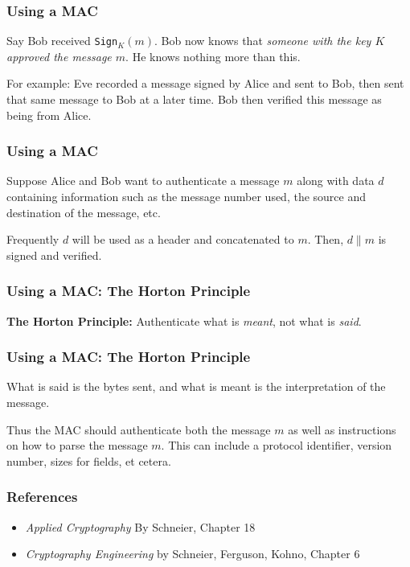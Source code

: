 \documentclass{beamer}
\newcommand{\<}{\langle}
\renewcommand{\>}{\rangle}
\begin{document}
\begin{frame}[fragile]
\frametitle{Using a MAC}

Say Bob received \verb|Sign|$_K(m)$. Bob now knows that \emph{someone with the key $K$ approved the message $m$}. He knows nothing more than this.\newline

For example: Eve recorded a message signed by Alice and sent to Bob, then sent that same message to Bob at a later time. Bob then verified this message as being from Alice.
\end{frame}


\begin{frame}[fragile]
\frametitle{Using a MAC}

Suppose Alice and Bob want to authenticate a message $m$ along with data $d$ containing information such as the message number used, the source and destination of the message, etc. \newline

Frequently $d$ will be used as a header and concatenated to $m$. Then, $d\| m$ is signed and verified.
\end{frame}


\begin{frame}[fragile]
\frametitle{Using a MAC: The Horton Principle}

\textbf{The Horton Principle:} Authenticate what is \emph{meant}, not what is \emph{said}. 
\end{frame}

\begin{frame}
\frametitle{Using a MAC: The Horton Principle}

What is said is the bytes sent, and what is meant is the interpretation of the message. \newline

Thus the MAC should authenticate both the message $m$ as well as instructions on how to parse the message $m$. This can include a protocol identifier, version number, sizes for fields, et cetera.
\end{frame}


\begin{frame}
\frametitle{References}

\begin{itemize}
\item \emph{Applied Cryptography} By Schneier, Chapter 18
\item \emph{Cryptography Engineering} by Schneier, Ferguson, Kohno, Chapter 6
\end{itemize}
\end{frame}
\end{document}
